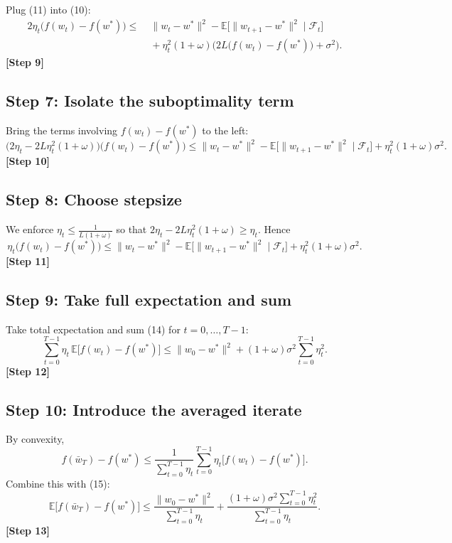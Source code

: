 \documentclass{article}
\newcommand{\E}{\mathbb{E}}
\begin{document}
Plug (11) into (10):
\[
\begin{aligned}
2\eta_{t}\bigl(f(w_{t})-f(w^{*})\bigr)
\le &\;\|w_{t}-w^{*}\|^{2}-\E\!\bigl[\|w_{t+1}-w^{*}\|^{2}\mid\mathcal{F}_{t}\bigr] \\
   &\;+\eta_{t}^{2}(1+\omega)\bigl(2L\bigl(f(w_{t})-f(w^{*})\bigr)+\sigma^{2}\bigr). \tag{12}
\end{aligned}
\]
\textbf{[Step 9]}

\subsection*{Step 7: Isolate the suboptimality term}
Bring the terms involving $f(w_{t})-f(w^{*})$ to the left:
\[
\bigl(2\eta_{t}-2L\eta_{t}^{2}(1+\omega)\bigr)\bigl(f(w_{t})-f(w^{*})\bigr)
\le \|w_{t}-w^{*}\|^{2}-\E\!\bigl[\|w_{t+1}-w^{*}\|^{2}\mid\mathcal{F}_{t}\bigr]
     +\eta_{t}^{2}(1+\omega)\sigma^{2}. \tag{13}
\]
\textbf{[Step 10]}

\subsection*{Step 8: Choose stepsize}
We enforce $\eta_{t}\le \frac{1}{L(1+\omega)}$ so that $2\eta_{t}-2L\eta_{t}^{2}(1+\omega)\ge \eta_{t}$.  
Hence
\[
\eta_{t}\bigl(f(w_{t})-f(w^{*})\bigr)
\le \|w_{t}-w^{*}\|^{2}-\E\!\bigl[\|w_{t+1}-w^{*}\|^{2}\mid\mathcal{F}_{t}\bigr]
     +\eta_{t}^{2}(1+\omega)\sigma^{2}. \tag{14}
\]
\textbf{[Step 11]}

\subsection*{Step 9: Take full expectation and sum}
Take total expectation and sum (14) for $t=0,\dots,T-1$:
\[
\sum_{t=0}^{T-1}\eta_{t}\,\E\!\bigl[f(w_{t})-f(w^{*})\bigr]
\le \|w_{0}-w^{*}\|^{2}
   + (1+\omega)\sigma^{2}\sum_{t=0}^{T-1}\eta_{t}^{2}. \tag{15}
\]
\textbf{[Step 12]}

\subsection*{Step 10: Introduce the averaged iterate}
By convexity,
\[
f(\bar w_{T})-f(w^{*})\le\frac{1}{\sum_{t=0}^{T-1}\eta_{t}}\sum_{t=0}^{T-1}\eta_{t}\bigl[f(w_{t})-f(w^{*})\bigr].
\]
Combine this with (15):
\[
\E\!\bigl[f(\bar w_{T})-f(w^{*})\bigr]
\le\frac{\|w_{0}-w^{*}\|^{2}}{\sum_{t=0}^{T-1}\eta_{t}}
   +\frac{(1+\omega)\sigma^{2}\sum_{t=0}^{T-1}\eta_{t}^{2}}{\sum_{t=0}^{T-1}\eta_{t}}. \tag{16}
\]
\textbf{[Step 13]}
\end{document}
